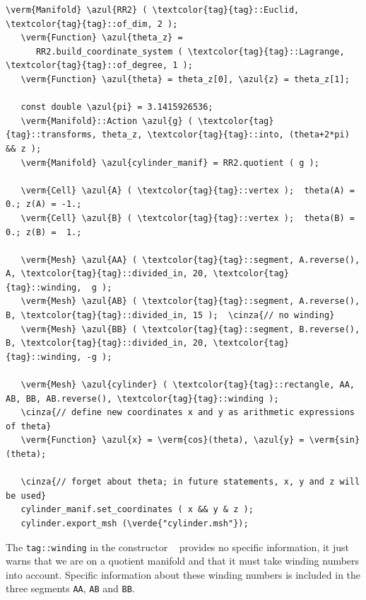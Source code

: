 \begin{Verbatim}[commandchars=\\\{\},formatcom=\small\tt,frame=single,
   label=parag-\ref{\numb section 7.\numb parag 3}.cpp,rulecolor=\color{coment},
   baselinestretch=0.94,framesep=2mm                                            ]
   \verm{Manifold} \azul{RR2} ( \textcolor{tag}{tag}::Euclid, \textcolor{tag}{tag}::of_dim, 2 );
   \verm{Function} \azul{theta_z} =
      RR2.build_coordinate_system ( \textcolor{tag}{tag}::Lagrange, \textcolor{tag}{tag}::of_degree, 1 );
   \verm{Function} \azul{theta} = theta_z[0], \azul{z} = theta_z[1];

   const double \azul{pi} = 3.1415926536;
   \verm{Manifold}::Action \azul{g} ( \textcolor{tag}{tag}::transforms, theta_z, \textcolor{tag}{tag}::into, (theta+2*pi) && z );
   \verm{Manifold} \azul{cylinder_manif} = RR2.quotient ( g );

   \verm{Cell} \azul{A} ( \textcolor{tag}{tag}::vertex );  theta(A) = 0.; z(A) = -1.;
   \verm{Cell} \azul{B} ( \textcolor{tag}{tag}::vertex );  theta(B) = 0.; z(B) =  1.;

   \verm{Mesh} \azul{AA} ( \textcolor{tag}{tag}::segment, A.reverse(), A, \textcolor{tag}{tag}::divided_in, 20, \textcolor{tag}{tag}::winding,  g );
   \verm{Mesh} \azul{AB} ( \textcolor{tag}{tag}::segment, A.reverse(), B, \textcolor{tag}{tag}::divided_in, 15 );  \cinza{// no winding}
   \verm{Mesh} \azul{BB} ( \textcolor{tag}{tag}::segment, B.reverse(), B, \textcolor{tag}{tag}::divided_in, 20, \textcolor{tag}{tag}::winding, -g );

   \verm{Mesh} \azul{cylinder} ( \textcolor{tag}{tag}::rectangle, AA, AB, BB, AB.reverse(), \textcolor{tag}{tag}::winding );
   \cinza{// define new coordinates x and y as arithmetic expressions of theta}
   \verm{Function} \azul{x} = \verm{cos}(theta), \azul{y} = \verm{sin}(theta);

   \cinza{// forget about theta; in future statements, x, y and z will be used}
   cylinder_manif.set_coordinates ( x && y & z );
   cylinder.export_msh (\verde{"cylinder.msh"});
\end{Verbatim}

The {\small\tt\textcolor{tag}{tag}::winding} in the constructor {\small\tt{}
} provides no specific information, it just warns {\maniFEM} that
we are on a quotient manifold and that it must take winding numbers into account.
Specific information about these winding numbers is included in the three segments
{\small\tt AA}, {\small\tt AB} and {\small\tt BB}.

